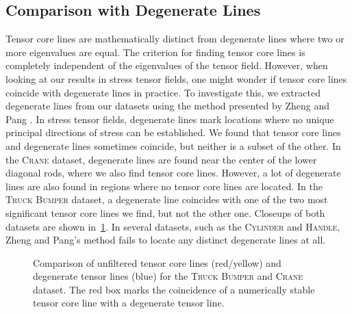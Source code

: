 \subsection{Comparison with Degenerate Lines} %
\label{sub:comparison_with_degenerate_lines}
%
Tensor core lines are mathematically distinct from degenerate lines where two or
more eigenvalues are equal.
%
The criterion for finding tensor core lines is completely independent of the
eigenvalues of the tensor field.
%
However, when looking at our results in stress tensor fields, one might wonder
if tensor core lines coincide with degenerate lines in practice.
%
To investigate this, we extracted degenerate lines from our datasets using the
method presented by Zheng and Pang \cite{Zheng2004}.
%
In stress tensor fields, degenerate lines mark locations where no unique
principal directions of stress can be established.
%
We found that tensor core lines and degenerate lines sometimes coincide, but
neither is a subset of the other.
%
In the \textsc{Crane} dataset, degenerate lines are found near the center of the
lower diagonal rods, where we also find tensor core lines.
%
However, a lot of degenerate lines are also found in regions where no tensor
core lines are located.
%
In the \textsc{Truck Bumper} dataset, a degenerate line coincides with one of
the two most significant tensor core lines we find, but not the other one.
%
Closeups of both datasets are shown in~\cref{fig:topo_comparison}.
%
In several datasets, such as the \textsc{Cylinder} and \textsc{Handle}, Zheng
and Pang's method fails to locate any distinct degenerate lines at all.
%
\begin{figure}[p]
    \begin{captionbeside}{Comparison of unfiltered tensor core lines
    (red/yellow) and degenerate tensor lines (blue) for the \textsc{Truck
    Bumper} and \textsc{Crane} dataset. The red box marks the
    coincidence of a numerically stable tensor core line with a degenerate
    tensor line.\label{fig:topo_comparison}}
        \setlength{\figurewidth}{0.7\textwidth}
        
    \end{captionbeside}
\end{figure}
%
%
